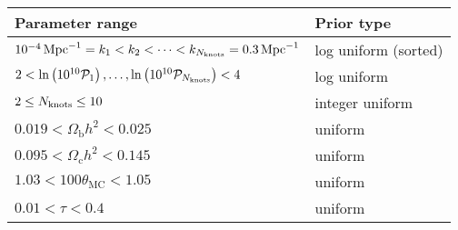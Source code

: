 \begin{tabular}{ll}
  Parameter range &
  Prior type
  \\
  \toprule
  $10^{-4}\,\mathrm{Mpc}^{-1} = k_1< k_2 < \cdots < k_{N_\mathrm{knots}} = 0.3\,\mathrm{Mpc}^{-1}$ &
  log uniform (sorted)
  \\
  $ 2 < \ln\left(10^{10}\mathcal{P}_{1}\right), \ldots ,\ln\left(10^{10}\mathcal{P}_{{N_\mathrm{knots}}}\right) < 4 $  &
  log uniform
  \\
  $2\le N_\mathrm{knots} \le 10 $ &
  integer uniform
  \\
  \midrule
  $0.019< \Omega_\mathrm{b} h^2 <0.025$ &
  uniform
  \\
  $0.095< \Omega_\mathrm{c} h^2 <0.145$ &
  uniform
  \\
  $1.03< 100\theta_\mathrm{MC} <1.05$ &
  uniform
  \\
  $0.01< \tau< 0.4$ &
  uniform
  \\
  \bottomrule
\end{tabular}

